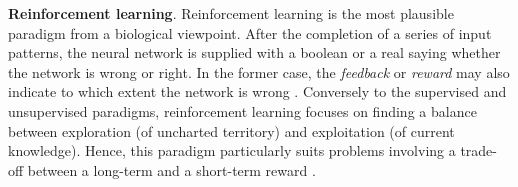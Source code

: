 \documentclass[11pt, a4paper]{report}
\numberwithin{equation}{chapter}
\theoremstyle{theorem}
\theoremstyle{definition}
\numberwithin{figure}{section}
\begin{document}
		\vspace*{0.3cm}
		
		\noindent \textbf{Reinforcement learning}. Reinforcement learning is the most plausible paradigm from a biological viewpoint. After the completion of a series of input patterns, the neural network is supplied with a boolean or a real saying whether the network is wrong or right. In the former case, the \emph{feedback} or \emph{reward} may also indicate to which extent the network is wrong \cite{Kri}. Conversely to the supervised and unsupervised paradigms, reinforcement learning focuses on finding a balance between exploration (of uncharted territory) and exploitation (of current knowledge). Hence, this paradigm particularly suits problems involving a trade-off between a long-term and a short-term reward \cite{KLM96}.
		
		\vspace*{0.3cm}
		
\end{document}
